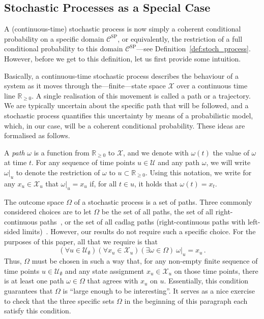 \documentclass[10pt,a4paper]{paper}
\theoremstyle{definition}
\newcommand{\reals}{\mathbb{R}}
\newcommand{\realsnonneg}{\reals_{\geq 0}}
\newcommand{\states}{\mathcal{X}}
\begin{document}
\subsection{Stochastic Processes as a Special Case}\label{sec:def_stochastic_processes}

A (continuous-time) stochastic process is now simply a coherent conditional probability on a specific domain $\mathcal{C}^\mathrm{SP}$, or equivalently, the restriction of a full conditional probability to this domain $\mathcal{C}^\mathrm{SP}$---see Definition~\ref{def:stoch_process}. However, before we get to this definition, let us first provide some intuition.


Basically, a continuous-time stochastic process describes the behaviour of a system as it moves through the---finite---state space $\states$ over a continuous time line $\realsnonneg$. A single realisation of this movement is called a path or a trajectory. We are typically uncertain about the specific path that will be followed, and a stochastic process quantifies this uncertainty by means of a probabilistic model, which, in our case, will be a coherent conditional probability. These ideas are formalised as follows.


A \emph{path} $\omega$ is a function from $\realsnonneg$ to $\states$, and we denote with $\omega(t)$ the value of $\omega$ at time $t$. For any sequence of time points $u\in\mathcal{U}$ and any path $\omega$, we will write $\omega\vert_{u}$ to denote the restriction of $\omega$ to $u\subset\realsnonneg$. Using this notation, we write for any $x_u\in\states_u$ that $\omega\vert_u=x_u$ if, for all $t\in u$, it holds that $\omega(t)=x_{t}$.%

The outcome space $\Omega$ of a stochastic process is a set of paths. Three commonly considered choices are to let $\Omega$ be the set of all paths, the set of all right-continuous paths~\cite{norris1998markov}, or the set of all cadlag paths (right-continuous paths with left-sided limits)~\cite{williams2000}. However, our results do not require such a specific choice. For the purposes of this paper, all that we require is that
\begin{equation}\label{eq:path_exists_for_finite_points}
(\forall u\in\mathcal{U}_\emptyset)(\forall x_u\in\states_u)(\exists \omega\in\Omega)~\omega\vert_u=x_u\,.
\end{equation}
Thus, $\Omega$ must be chosen in such a way that, for any non-empty finite sequence of time points $u\in\mathcal{U}_\emptyset$ and any state assignment $x_u\in\states_u$ on those time points, there is at least one path $\omega\in\Omega$ that agrees with $x_u$ on $u$. Essentially, 
this condition
guarantees that $\Omega$ is ``large enough to be interesting''. It serves as a nice exercise to check that the three specific sets $\Omega$ in the beginning of this paragraph each satisfy this condition.
\end{document}
